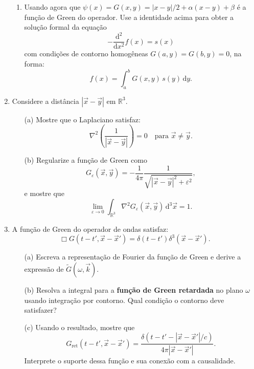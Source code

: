\begin{enumerate}
\begin{enumerate}
		      \item Usando agora que $\psi(x) = G(x, y) = {|x - y|}/{2} + \alpha(x - y)
			            + \beta$ é a função de Green do operador. Use a identidade acima
		            para obter a solução formal da equação
		            $$
			            - \frac{\mathrm{d}^2}{\mathrm{d}x^2} f(x) = s(x)
		            $$
		            com condições de contorno homogêneas $G(a, y) = G(b, y) = 0$, na forma:
		            $$
			            f(x) = \int_a^b G(x, y)\, s(y)\, \mathrm{d}y.
		            $$
	      \end{enumerate}
	\item Considere a distância $|\vec{x} - \vec{y}|$ em $\mathbb{R}^3$.
	      \begin{itemize}
		      \item[(a)] Mostre que o Laplaciano satisfaz:
		            $$
			            \nabla^2 \left( \frac{1}{|\vec{x} - \vec{y}|} \right) = 0 \quad \text{para } \vec{x} \neq \vec{y}.
		            $$

		      \item[(b)] Regularize a função de Green como
		            $$
			            G_\varepsilon(\vec{x}, \vec{y}) = -\frac{1}{4\pi} \frac{1}{\sqrt{|\vec{x} - \vec{y}|^2 + \varepsilon^2}},
		            $$
		            e mostre que
		            $$
			            \lim_{\varepsilon \to 0} \int_{\mathbb{R}^3} \nabla^2 G_\varepsilon(\vec{x}, \vec{y}) \, \mathrm{d}^3 \vec{x} = 1.
		            $$
	      \end{itemize}
	\item A função de Green do operador de ondas satisfaz:
	      $$
		      \Box G(t - t', \vec{x} - \vec{x}') = \delta(t - t') \delta^3(\vec{x} - \vec{x}').
	      $$

	      \begin{itemize}
		      \item[(a)] Escreva a representação de Fourier da função de Green e derive a expressão de $\tilde{G}(\omega, \vec{k})$.

		      \item[(b)] Resolva a integral para a \textbf{função de Green retardada} no plano $\omega$ usando integração por contorno. Qual condição o contorno deve satisfazer?

		      \item[(c)] Usando o resultado, mostre que
		            $$
			            G_{\text{ret}}(t - t', \vec{x} - \vec{x}') = \frac{\delta(t - t' - |\vec{x} - \vec{x}'|/c)}{4\pi |\vec{x} - \vec{x}'|}.
		            $$
		            Interprete o suporte dessa função e sua conexão com a causalidade.
	      \end{itemize}
\end{enumerate}



